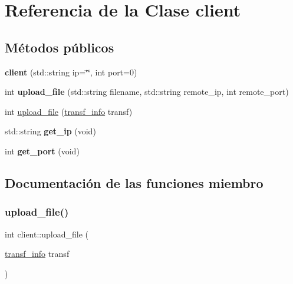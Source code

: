 \hypertarget{classclient}{}\section{Referencia de la Clase client}
\label{classclient}
\subsection*{Métodos públicos}
\begin{DoxyCompactItemize}
\item 
\mbox{\label{classclient_ad6d60f584e78a52b5fefcb5c4a50bd76}} 
{\bfseries client} (std\+::string ip=\char`\"{}\char`\"{}, int port=0)
\item 
\mbox{\label{classclient_a368b7cb1a96e6bcf4f96fba54aa431e9}} 
int {\bfseries upload\+\_\+file} (std\+::string filename, std\+::string remote\+\_\+ip, int remote\+\_\+port)
\item 
int \hyperlink{classclient_ad95e87b6c247313d2ebc2976a3d25117}{upload\+\_\+file} (\hyperlink{structtransf__info}{transf\+\_\+info} transf)
\item 
\mbox{\label{classclient_a050303ea3d6bd349a78e29b525d59ec9}} 
std\+::string {\bfseries get\+\_\+ip} (void)
\item 
\mbox{\label{classclient_ad06b72ab9ff49c86ecbc1696364cf491}} 
int {\bfseries get\+\_\+port} (void)
\end{DoxyCompactItemize}


\subsection{Documentación de las funciones miembro}
\mbox{\label{classclient_ad95e87b6c247313d2ebc2976a3d25117}} 
\subsubsection{\texorpdfstring{upload\+\_\+file()}{upload\_file()}}
{\footnotesize\ttfamily int client\+::upload\+\_\+file (\begin{DoxyParamCaption}\item[{\hyperlink{structtransf__info}{transf\+\_\+info}}]{transf }\end{DoxyParamCaption})}

